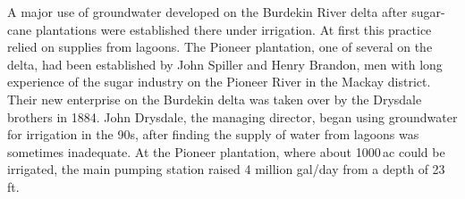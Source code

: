 A major use of groundwater developed on the Burdekin River delta after
sugar-cane plantations were established there under irrigation.  At
first this practice relied on supplies from lagoons.  The Pioneer
plantation, one of several on the delta, had been established by John
Spiller and Henry Brandon, men with long experience of the sugar
industry on the Pioneer River in the Mackay district.  Their new
enterprise on the Burdekin delta was taken over by the Drysdale
brothers in 1884.  John Drysdale, the managing director, began using
groundwater for irrigation in the 90s, after finding the supply of
water from lagoons was sometimes inadequate.  At the Pioneer
plantation, where about 1000\,ac could be irrigated, the main pumping
station raised 4 million gal/day from a depth of
23\,ft.


